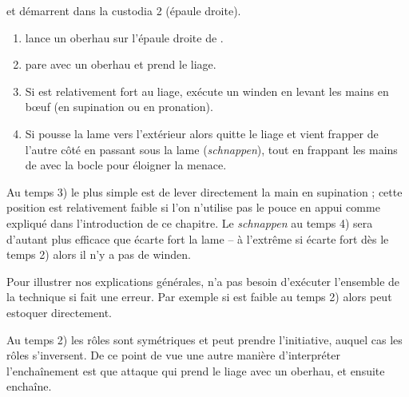 \begin{technique}[Liegniczer 1]

\A et \D démarrent dans la custodia 2 (épaule droite).

\begin{enumerate}
	\item \A lance un oberhau sur l'épaule droite de \D.
	
	\item \D pare avec un oberhau et prend le liage.
	
	\item {}
		Si \D est relativement fort au liage, \A exécute un winden en levant les mains en bœuf (en supination ou en pronation).
	
	\item {}
		Si \D pousse la lame vers l'extérieur alors \A quitte le liage et vient frapper \D de l'autre côté en passant sous la lame (\emph{schnappen}),
		tout en frappant les mains de \D avec la bocle pour éloigner la menace.
\end{enumerate}

Au temps 3) le plus simple est de lever directement la main en supination ; cette position est relativement faible si l'on n'utilise pas le pouce en appui comme expliqué dans l'introduction de ce chapitre.
Le \emph{schnappen} au temps 4) sera d'autant plus efficace que \D écarte fort la lame – à l'extrême si \D écarte fort dès le temps 2) alors il n'y a pas de winden.

Pour illustrer nos explications générales, \A n'a pas besoin d'exécuter l'ensemble de la technique si \D fait une erreur.
Par exemple si \D est faible au temps 2) alors \A peut estoquer directement.

Au temps 2) les rôles sont symétriques et \D peut prendre l'initiative, auquel cas les rôles s'inversent.
De ce point de vue une autre manière d'interpréter l'enchaînement est que \D attaque \A qui prend le liage avec un oberhau, et ensuite enchaîne.


\end{technique}
